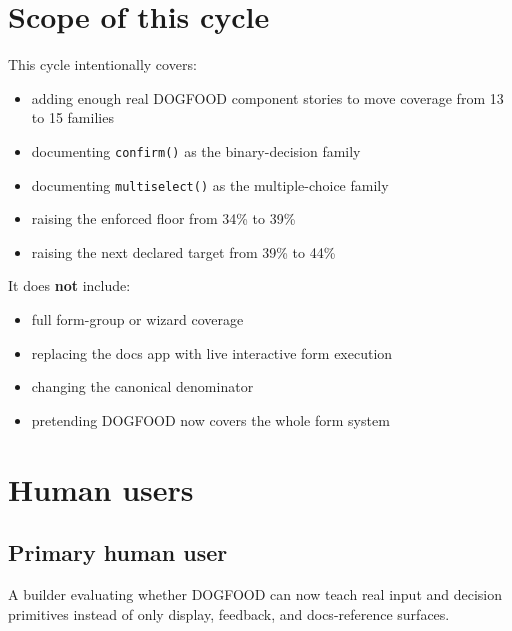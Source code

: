 \section{Scope of this cycle}\label{record-071-scope-of-this-cycle}

This cycle intentionally covers:

\begin{itemize}
\tightlist
\item
  adding enough real DOGFOOD component stories to move coverage from 13 to 15 families
\item
  documenting \texttt{c\allowbreak{}o\allowbreak{}n\allowbreak{}f\allowbreak{}i\allowbreak{}r\allowbreak{}m\allowbreak{}(\allowbreak{})} as the binary-decision family
\item
  documenting \texttt{m\allowbreak{}u\allowbreak{}l\allowbreak{}t\allowbreak{}i\allowbreak{}s\allowbreak{}e\allowbreak{}l\allowbreak{}e\allowbreak{}c\allowbreak{}t\allowbreak{}(\allowbreak{})} as the multiple-choice family
\item
  raising the enforced floor from 34\% to 39\%
\item
  raising the next declared target from 39\% to 44\%
\end{itemize}

It does \textbf{not} include:

\begin{itemize}
\tightlist
\item
  full form-group or wizard coverage
\item
  replacing the docs app with live interactive form execution
\item
  changing the canonical denominator
\item
  pretending DOGFOOD now covers the whole form system
\end{itemize}

\section{Human users}\label{record-071-human-users}

\subsection{Primary human user}\label{record-071-primary-human-user}

A builder evaluating whether DOGFOOD can now teach real input and decision primitives instead of only display, feedback, and docs-reference surfaces.

